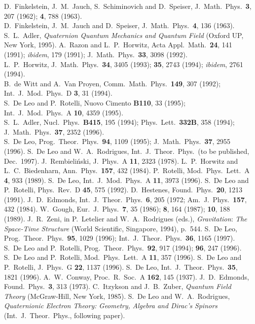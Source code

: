 \begin{references}


D.~Finkelstein, J.~M.~Jauch, S.~Schiminovich and D.~Speiser,
   J.~Math.~Phys.~{\bf 3}, 207 (1962); {\bf 4}, 788 (1963).\\
D.~Finkelstein, J.~M.~Jauch and D.~Speiser,
   J.~Math.~Phys.~{\bf 4}, 136 (1963).
S.~L.~Adler, 
   {\em Quaternion Quantum Mechanics and Quantum Field}
(Oxford UP, New York, 1995).
A.~Razon and L.~P.~Horwitz, 
   Acta Appl.~Math.~{\bf 24}, 141 (1991);
   {\em ibidem}, 179 (1991); 
   J.~Math.~Phys.~{\bf 33}, 3098 (1992).\\
L.~P.~Horwitz, 
   J.~Math.~Phys.~{\bf 34}, 3405 (1993); 
   {\bf 35}, 2743 (1994);
   {\em ibidem}, 2761 (1994).\\
B.~de Witt and A.~Van Proyen, 
   Comm.~Math.~Phys.~{\bf 149}, 307 (1992);
   Int.~J.~Mod.~Phys.~D {\bf 3}, 31 (1994).\\ 
S.~De Leo and P.~Rotelli, 
   Nuovo Cimento {\bf B110}, 33 (1995);
   Int.~J.~Mod.~Phys.~A {\bf 10}, 4359 (1995).\\
S.~L.~Adler,
   Nucl.~Phys.~{\bf B415}, 195 (1994);
   Phys.~Lett.~{\bf 332B}, 358 (1994);
   J.~Math.~Phys.~{\bf 37}, 2352 (1996).\\
S.~De Leo,
   Prog.~Theor.~Phys.~{\bf 94}, 1109 (1995);
   J.~Math.~Phys.~{\bf 37}, 2955 (1996).
S.~De Leo and W.~A.~Rodrigues,
   Int.~J.~Theor.~Phys.~(to be published, Dec.~1997).
J.~Rembieli\'nski,
   J.~Phys.~A {\bf 11}, 2323 (1978).
L.~P.~Horwitz and L.~C.~Biedenharn,
   Ann.~Phys.~{\bf 157}, 432 (1984).
P.~Rotelli,
   Mod.~Phys.~Lett.~A {\bf 4}, 933 (1989).
S.~De Leo,
   Int.~J.~Mod.~Phys.~A {\bf 11}, 3973 (1996).
S.~De Leo and P.~Rotelli, 
   Phys.~Rev.~D {\bf 45}, 575 (1992).
D.~Hestenes, 
   Found.~Phys.~{\bf 20}, 1213 (1991).
J.~D.~Edmonds,
   Int.~J.~Theor.~Phys.~{\bf 6}, 205 (1972;
   Am.~J.~Phys.~{\bf 157}, 432 (1984).
W.~Gough,
   Eur.~J.~Phys.~{\bf 7}, 35 (1986);
                 {\bf 8}, 164 (1987);
                 {\bf 10}, 188 (1989).
J.~R.~Zeni, 
   in P.~Letelier and W.~A.~Rodrigues (eds.),  
   {\em Gravitation}: {\em The Space-Time Structure}
   (World Scientific, Singapore, 1994), p.~544.
S.~De Leo,
   Prog.~Theor.~Phys.~{\bf 95}, 1029 (1996);
   Int.~J.~Theor.~Phys.~{\bf 36}, 1165 (1997).
S.~De Leo and P.~Rotelli, 
   Prog.~Theor.~Phys.~{\bf 92}, 917 (1994);
                      {\bf 96}, 247 (1996).
S.~De Leo and P.~Rotelli, 
   Mod.~Phys.~Lett.~A {\bf 11}, 357 (1996).
S.~De Leo and P.~Rotelli, 
   J.~Phys.~G {\bf 22}, 1137 (1996).
S.~De Leo,
   Int.~J.~Theor.~Phys.~{\bf 35}, 1821 (1996).
A.~W.~Conway, Proc.~R.~Soc.~A {\bf 162}, 145 (1937).
J.~D.~Edmonds,
   Found.~Phys.~{\bf 3}, 313 (1973).
C.~Itzykson and J.~B.~Zuber,
   {\em Quantum Field Theory} (McGraw-Hill, New York, 1985).
S.~De Leo and W.~A.~Rodrigues,
   {\em Quaternionic Electron Theory: Geometry, Algebra and Dirac's Spinors}\\ 
   (Int.~J.~Theor.~Phys., following paper). 



\end{references}
